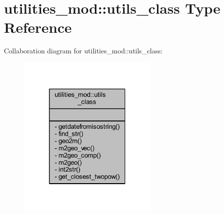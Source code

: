\hypertarget{structutilities__mod_1_1utils__class}{}\section{utilities\+\_\+mod\+:\+:utils\+\_\+class Type Reference}
\label{structutilities__mod_1_1utils__class}


Collaboration diagram for utilities\+\_\+mod\+:\+:utils\+\_\+class\+:\nopagebreak
\begin{figure}[H]
\begin{center}
\leavevmode
\includegraphics[width=196pt]{structutilities__mod_1_1utils__class__coll__graph}
\end{center}
\end{figure}
